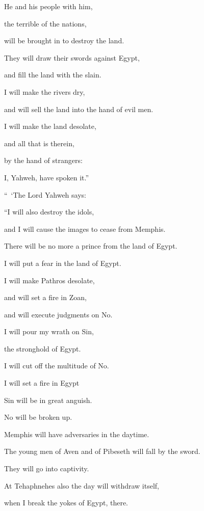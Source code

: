 {\par }{\Q {}He and his people with him,
\par }{\QB the terrible of the nations,
\par }{\Q will be brought in to destroy the land.
\par }{\QB They will draw their swords against Egypt,
\par }{\QB and fill the land with the slain.
\par }{\Q {}I will make the rivers dry,
\par }{\QB and will sell the land into the hand of evil men.
\par }{\Q I will make the land desolate,
\par }{\QB and all that is therein,
\par }{\QB by the hand of strangers:
\par }{\QB I, Yahweh, have spoken it.”
\par }{\PP {}“ ‘The Lord Yahweh says:
\par }{\Q “I will also destroy the idols,
\par }{\QB and I will cause the images to cease from Memphis.
\par }{\Q There will be no more a prince from the land of Egypt.
\par }{\QB I will put a fear in the land of Egypt.
\par }{\Q {}I will make Pathros desolate,
\par }{\QB and will set a fire in Zoan,
\par }{\QB and will execute judgments on No.
\par }{\Q {}I will pour my wrath on Sin,
\par }{\QB the stronghold of Egypt.
\par }{\QB I will cut off the multitude of No.
\par }{\Q {}I will set a fire in Egypt
\par }{\QB Sin will be in great anguish.
\par }{\Q No will be broken up.
\par }{\QB Memphis will have adversaries in the daytime.
\par }{\Q {}The young men of Aven and of Pibeseth will fall by the sword.
\par }{\QB They will go into captivity.
\par }{\Q {}At Tehaphnehes also the day will withdraw itself,
\par }{\QB when I break the yokes of Egypt, there.
}
